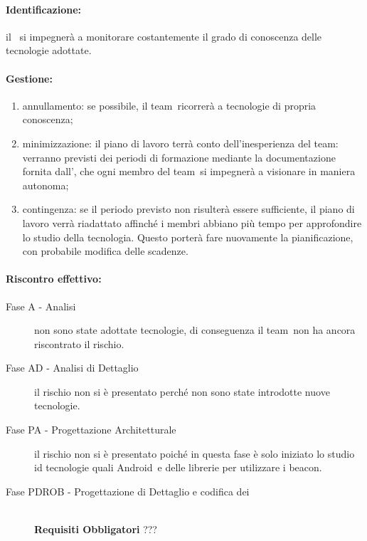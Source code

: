 \documentclass[../PianoProgetto.tex]{subfiles}
\begin{document}
	\paragraph*{Identificazione:} il \responsabilediprogetto\ si impegnerà a monitorare costantemente il grado di conoscenza delle tecnologie adottate.	
	
	\paragraph*{Gestione:}
	\begin{enumerate}
		\item annullamento: se possibile, il team\g\ ricorrerà a tecnologie di propria conoscenza;
		\item minimizzazione: il piano di lavoro terrà conto dell'inesperienza del team\g : verranno previsti dei periodi di formazione mediante la documentazione fornita dall'\amministratore , che ogni membro del team\g\ si impegnerà a visionare in maniera autonoma;
		\item contingenza: se il periodo previsto non risulterà essere sufficiente, il piano di lavoro verrà riadattato affinché i membri abbiano più tempo per approfondire lo studio della tecnologia. Questo porterà fare nuovamente la pianificazione, con probabile modifica delle scadenze.
	\end{enumerate}
	
	
	\paragraph*{Riscontro effettivo:} 
		\begin{description}
			\item[Fase A - Analisi] non sono state adottate tecnologie, di conseguenza il team\g\ non ha ancora riscontrato il rischio.
			\item[Fase AD - Analisi di Dettaglio] il rischio non si è presentato perché non sono state introdotte nuove tecnologie.
			\item[Fase PA - Progettazione Architetturale] il rischio non si è presentato poiché in questa fase è solo iniziato lo studio id tecnologie quali Android\g\ e delle librerie per utilizzare i beacon\g.
			\item[Fase PDROB - Progettazione di Dettaglio e codifica dei]  \ \\
					\textbf{Requisiti Obbligatori} ???
		\end{description}
\end{document}
